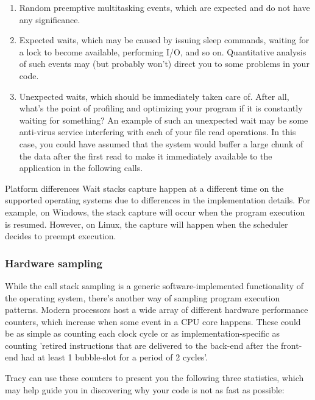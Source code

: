 \documentclass[hidelinks,titlepage,a4paper]{article}
\begin{document}
\begin{enumerate}
\item Random preemptive multitasking events, which are expected and do not have any significance.
\item Expected waits, which may be caused by issuing sleep commands, waiting for a lock to become available, performing I/O, and so on. Quantitative analysis of such events may (but probably won't) direct you to some problems in your code.
\item Unexpected waits, which should be immediately taken care of. After all, what's the point of profiling and optimizing your program if it is constantly waiting for something? An example of such an unexpected wait may be some anti-virus service interfering with each of your file read operations. In this case, you could have assumed that the system would buffer a large chunk of the data after the first read to make it immediately available to the application in the following calls.
\end{enumerate}

\begin{bclogo}[
noborder=true,
couleur=black!5,
logo=\bcattention
]{Platform differences}
Wait stacks capture happen at a different time on the supported operating systems due to differences in the implementation details. For example, on Windows, the stack capture will occur when the program execution is resumed. However, on Linux, the capture will happen when the scheduler decides to preempt execution.
\end{bclogo}

\subsubsection{Hardware sampling}
\label{hardwaresampling}

While the call stack sampling is a generic software-implemented functionality of the operating system, there's another way of sampling program execution patterns. Modern processors host a wide array of different hardware performance counters, which increase when some event in a CPU core happens. These could be as simple as counting each clock cycle or as implementation-specific as counting 'retired instructions that are delivered to the back-end after the front-end had at least 1 bubble-slot for a period of 2 cycles'.

Tracy can use these counters to present you the following three statistics, which may help guide you in discovering why your code is not as fast as possible:
\end{document}

